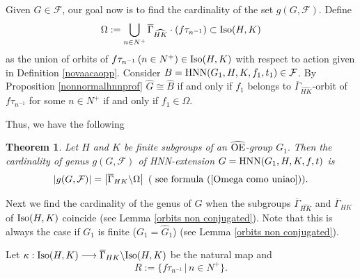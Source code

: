\documentclass[a4paper,12pt]{article}
\newtheorem{thm}{Theorem}[section]
\newtheorem{cor}[thm]{Corollary}
\newcommand{\Oe}{\rm \widehat{OE}}
\def\out {{\rm Out}}
\def\hnn {{\rm HNN}}
\def\Iso {{\rm Iso}}
\begin{document}
{%



Given $G\in \mathcal{F}$, our goal now is to find the cardinality of the set $g(G, \mathcal{F})$.   Define \begin{equation} \label{Omega como uniao} \Omega:=\bigcup_{n\in N^{+}}\overline{\Gamma}_{\widehat{HK}} \cdot (f\tau_{n^{-1}}) \subset \Iso(H, K)\end{equation} as the union of orbits of  $f\tau_{n^{-1}}\,(n \in N^{+}) \in \Iso(H, K)$ with respect to action given in Definition \ref{novaacaopp}. Consider $B=\hnn(G_1,H,K,f_1,t_1)\in \mathcal{F}$. By Proposition \ref{nonnormalhnnprof} $\widehat G \cong \widehat B$ if and only if $f_1$ belongs to $\overline{\Gamma}_{\widehat{HK}}$-orbit of $f\tau_{n^{-1}}$ for some $n\in N^{+}$ if and only if $f_1 \in \Omega.$ 

Thus, we have the following 

\begin{thm}\label{fixed H} Let $H$ and $K$ be finite subgroups of an $\Oe$-group $G_1.$ Then the cardinality of  genus $g(G, \mathcal{F})$ of HNN-extension $G=\hnn(G_1,H,K,f,t)$ is 
 $$|g(G, \mathcal{F})| = \left|\overline{\Gamma}_{HK}  \backslash \Omega\right|\,\,(\mbox{ see formula  } (\ref{Omega como uniao})).$$ 
\end{thm}




Next  we find the cardinality of the genus of $G$ when the subgroups  $\overline{\Gamma}_{\widehat{HK}}$ and $\overline{\Gamma}_{HK}$ of $\Iso(H,K)$ coincide (see Lemma \ref{orbits non conjugated}).   Note that this is always the case if $G_1$ is finite ($G_1 = \widehat{G}_1$) (see Lemma \ref{orbits non conjugated}). %




Let $\kappa: \Iso(H,K)\longrightarrow  \overline\Gamma_{HK}\backslash \Iso(H,K)$ be the natural map and \begin{equation} \label{O conjunto S} R:=\{f\tau_{n^{-1}}\,|\, n \in N^{+}\}.
\end{equation} 

}
\end{document}
